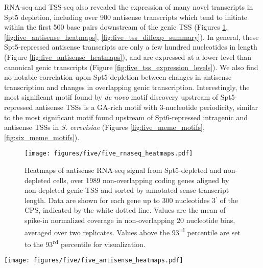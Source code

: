 RNA-seq and TSS-seq also revealed the expression of many novel transcripts in Spt5 depletion, including over 900 antisense transcripts which tend to initiate within the first 500 base pairs downstream of the genic TSS (Figures \ref{fig:five_rnaseq_heatmaps}, \ref{fig:five_antisense_heatmaps}, \ref{fig:five_tss_diffexp_summary}).
In general, these Spt5-repressed antisense transcripts are only a few hundred nucleotides in length (Figure \ref{fig:five_antisense_heatmaps}), and are expressed at a lower level than canonical genic transcripts (Figure \ref{fig:five_tss_expression_levels}).
We also find no notable correlation upon Spt5 depletion between changes in antisense transcription and changes in overlapping genic transcription.
Interestingly, the most significant motif found by \textit{de novo} motif discovery upstream of Spt5-repressed antisense TSSs is a GA-rich motif with 3-nucleotide periodicity, similar to the most significant motif found upstream of Spt6-repressed intragenic and antisense TSSs in \textit{S. cerevisiae} (Figures \ref{fig:five_meme_motifs}, \ref{fig:six_meme_motifs}).

\begin{figure}[h]
    \centering
    \texttt{[image: figures/five/five\_rnaseq\_heatmaps.pdf]}
    \caption[Heatmaps of antisense RNA-seq signal from Spt5-depleted and non-depleted cells, over non-overlapping coding genes.]{Heatmaps of antisense RNA-seq signal from Spt5-depleted and non-depleted cells, over 1989 non-overlapping coding genes aligned by non-depleted genic TSS and sorted by annotated sense transcript length. Data are shown for each gene up to 300 nucleotides 3$^\prime$ of the CPS, indicated by the white dotted line. Values are the mean of spike-in normalized coverage in non-overlapping 20 nucleotide bins, averaged over two replicates. Values above the 93\textsuperscript{rd} percentile are set to the 93\textsuperscript{rd} percentile for visualization.}
    \label{fig:five_rnaseq_heatmaps}
\end{figure}

\clearpage

\begin{sidewaysfigure}
    \centering
    \texttt{[image: figures/five/five\_antisense\_heatmaps.pdf]}
    \caption[Heatmaps of antisense TSS-seq, RNA-seq, and NET-seq signal from Spt5-depleted and non-depleted cells, for genes with Spt5-depletion-induced antisense TSSs.]{Heatmaps of antisense TSS-seq, RNA-seq, and NET-seq signal in Spt5 non-depleted and depleted cells, for all genes overlapping an Spt5-depletion-induced antisense TSS. Genes are aligned by the sense, genic TSS and sorted by the distance from the genic TSS to the antisense TSS. Values are the mean of spike-in normalized coverage in non-overlapping 20 nt bins, over one (non-depleted NET-seq) or more experiments. Values above the 0.995 (TSS-seq), 0.98 (RNA-seq), or 0.96 (NET-seq) quantiles are set to their respective quantiles for visualization.}
    \label{fig:five_antisense_heatmaps}
\end{sidewaysfigure}

